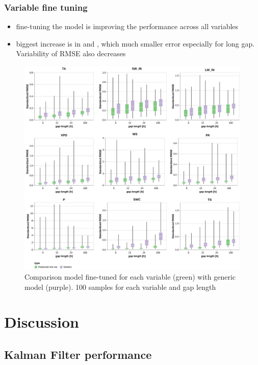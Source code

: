 \documentclass{article}
\newcommand{\imgwidth}{6in}
\let\Oldsection\section
\renewcommand{\section}{\FloatBarrier\Oldsection}
\let\Oldsubsection\subsection
\renewcommand{\subsection}{\FloatBarrier\Oldsubsection}
\begin{document}
\subsubsection{Variable fine tuning}

\begin{itemize}
    \item fine-tuning the model is improving the performance across all variables
    \item biggest increase is in  and , which much smaller error especially for long gap. Variability of RMSE also decreases
\end{itemize}

\begin{figure}
\centerline{\includegraphics[width=\imgwidth]{images2/generic.png}}
\caption{Comparison model fine-tuned for each variable (green) with generic model (purple). 100 samples for each variable and gap length}
\label{fig:generic}
\end{figure}


\section{Discussion}




\subsection{Kalman Filter performance}
\end{document}
